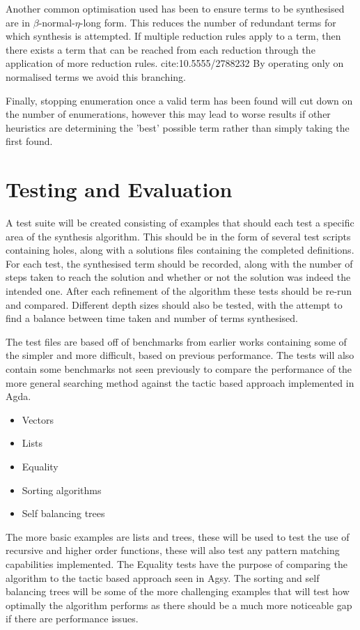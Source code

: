 \documentclass[a4paper]{article}
\begin{document}
Another common optimisation used has been to ensure terms to be synthesised are in \(\beta\)-normal-\(\eta\)-long form. This 
reduces the number of redundant terms for which synthesis is attempted. If multiple reduction rules apply to a term,
then there exists a term that can be reached from each reduction through the application of more reduction rules. cite:10.5555/2788232
By operating only on normalised terms we avoid this branching.

Finally, stopping enumeration once a valid term has been found will cut down on the 
number of enumerations, however this may lead to worse results if other heuristics are determining the 'best' possible
term rather than simply taking the first found. 

\section{Testing and Evaluation}
\label{sec:org8cb4d01}

A test suite will be created consisting of examples that should each test a specific area of the synthesis algorithm. 
This should be in the form of several test scripts containing holes, along with a solutions files containing the 
completed definitions. For each test, the synthesised term should be recorded, along with the number of steps 
taken to reach the solution and whether or not the solution was indeed the intended one. After each refinement of the 
algorithm these tests should be re-run and compared. Different depth sizes should also be tested, with the attempt
to find a balance between time taken and number of terms synthesised.  

The test files are based off of benchmarks from earlier works containing some of the simpler and more 
difficult, based on previous performance. The tests will also contain some benchmarks not seen previously to compare the
performance of the more general searching method against the tactic based approach implemented in Agda.   

\begin{itemize}
\item Vectors
\item Lists
\item Equality
\item Sorting algorithms
\item Self balancing trees
\end{itemize}

The more basic examples are lists and trees, these will be used to test the use of recursive and higher order 
functions, these will also test any pattern matching capabilities implemented. The Equality tests have the purpose of 
comparing the algorithm to the tactic based approach seen in Agsy. The sorting and self balancing trees will be some of the 
more challenging examples that will test how optimally the algorithm performs as there should be a much more noticeable 
gap if there are performance issues. 
\end{document}
